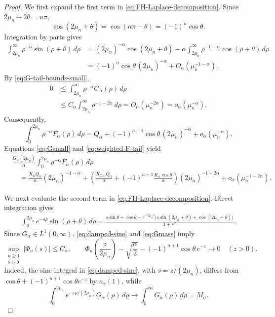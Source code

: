 \documentclass[11pt]{amsart}
\numberwithin{equation}{section}
\theoremstyle{remark}
\begin{document}
\begin{proof}
We first expand the first term in \eqref{eq:FH-Laplace-decomposition}.
Since $2\mu_n+2\theta=n\pi$,
\[
 \cos(2\mu_n+\theta)=\cos(n\pi-\theta)
 =(-1)^n\cos\theta.
\]
Integration by parts gives
\[
 \begin{aligned}
 \int_{2\mu_n}^\infty
 \rho^{-\alpha}\sin(\rho+\theta)\,d\rho&=(2\mu_n)^{-\alpha}\cos(2\mu_n+\theta)
 -\alpha\int_{2\mu_n}^\infty\rho^{-1-\alpha}
 \cos(\rho+\theta)\,d\rho\\
 &=(-1)^n\cos\theta\,(2\mu_n)^{-\alpha}
 +O_\alpha(\mu_n^{-1-\alpha}).
 \end{aligned}
\]
By \eqref{eq:G-tail-bounds-small},
\[
 \begin{aligned}
 0&\le\int_{2\mu_n}^\infty
 \rho^{-\alpha}G_\alpha(\rho)\,d\rho\\
 &\le C_\alpha\int_{2\mu_n}^\infty
 \rho^{-1-2\alpha}\,d\rho
 =O_\alpha(\mu_n^{-2\alpha})
 =o_\alpha(\mu_n^{-\alpha}).
 \end{aligned}
\]
Consequently,
\begin{equation}\label{eq:weighted-F-tail}
 \int_0^{2\mu_n}\rho^{-\alpha}F_\alpha(\rho)\,d\rho
 =Q_\alpha+(-1)^{n+1}\cos\theta\,(2\mu_n)^{-\alpha}
 +o_\alpha(\mu_n^{-\alpha}).
\end{equation}
Equations \eqref{eq:Gsmall} and \eqref{eq:weighted-F-tail} yield
\begin{equation}\label{eq:FH-first-part}
\begin{aligned}
 &\frac{G_\alpha(2\mu_n)}\alpha
 \int_0^{2\mu_n}\rho^{-\alpha}F_\alpha(\rho)\,d\rho\\
 &\quad=\frac{K_\alpha Q_\alpha}{\alpha}(2\mu_n)^{-1-\alpha}+\left(
 \frac{K_{2,\alpha}Q_\alpha}{\alpha}
 +(-1)^{n+1}\frac{K_\alpha\cos\theta}{\alpha}
 \right)(2\mu_n)^{-1-2\alpha}
 +o_\alpha(\mu_n^{-1-2\alpha}).
\end{aligned}
\end{equation}

We next evaluate the second term in \eqref{eq:FH-Laplace-decomposition}.
Direct integration gives
\begin{equation}\label{eq:damped-sine}
 \begin{aligned}
 \int_0^{2\mu_n}e^{-s\rho}\sin(\rho+\theta)\,d\rho
 =\frac{s\sin\theta+\cos\theta
 -e^{-2\mu_ns}\bigl(s\sin(2\mu_n+\theta)
 +\cos(2\mu_n+\theta)\bigr)}{1+s^2}.
 \end{aligned}
\end{equation}
Since $G_\alpha\in L^1(0,\infty)$, \eqref{eq:damped-sine} and
\eqref{eq:Gmass} imply
\begin{equation}\label{eq:Phi-bounds-limit}
 \sup_{\substack{n\ge1\\s>0}}|\Phi_n(s)|\le C_\alpha,
 \qquad
 \Phi_n\left(\frac z{2\mu_n}\right)
 -\sqrt{\frac\alpha2}
 -(-1)^{n+1}\cos\theta\,e^{-z}\longrightarrow0
 \quad(z>0).
\end{equation}
Indeed, the sine integral in \eqref{eq:damped-sine}, with
$s=z/(2\mu_n)$, differs from
$\cos\theta+(-1)^{n+1}\cos\theta e^{-z}$ by $o_\alpha(1)$, while
\[
 \int_0^{2\mu_n}e^{-z\rho/(2\mu_n)}G_\alpha(\rho)\,d\rho
 \longrightarrow\int_0^\infty G_\alpha(\rho)\,d\rho=M_\alpha.
\]


\end{proof}
\end{document}

